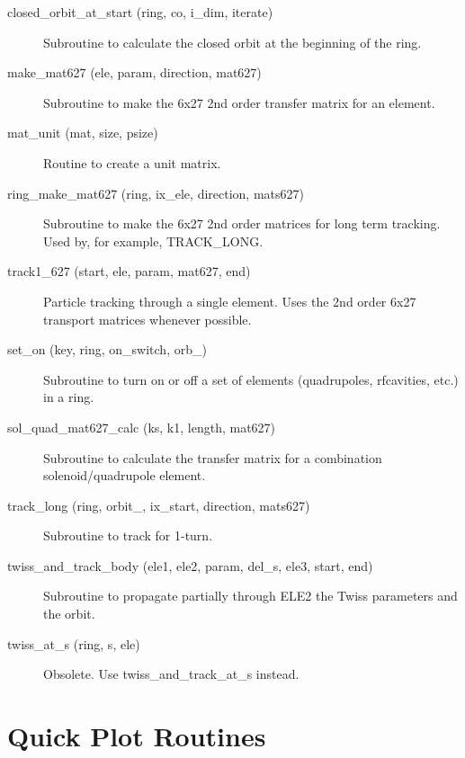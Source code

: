\begin{description}

\item[closed\_orbit\_at\_start (ring, co, i\_dim, iterate)] \Newline
Subroutine to calculate the closed orbit at the beginning of the ring. 

\item[make\_mat627 (ele, param, direction, mat627)] \Newline
Subroutine to make the 6x27 2nd order transfer matrix for an element. 

\item[mat\_unit (mat, size, psize)] \Newline 
Routine to create a unit matrix.

\item[ring\_make\_mat627 (ring, ix\_ele, direction, mats627)] \Newline
Subroutine to make the 6x27 2nd order matrices for long term tracking. 
Used by, for example, TRACK\_LONG. 

\item[track1\_627 (start, ele, param, mat627, end)] \Newline
Particle tracking through a single element. Uses the 2nd order 6x27 transport 
matrices whenever possible. 

\item[set\_on (key, ring, on\_switch, orb\_)] \Newline
Subroutine to turn on or off a set of elements (quadrupoles, rfcavities, etc.) in a ring. 

\item[sol\_quad\_mat627\_calc (ks, k1, length, mat627)] \Newline
Subroutine to calculate the transfer matrix for a combination solenoid/quadrupole element. 

\item[track\_long (ring, orbit\_, ix\_start, direction, mats627)] \Newline
Subroutine to track for 1-turn. 

\item[twiss\_and\_track\_body (ele1, ele2, param, del\_s, ele3, start, end)] \Newline
Subroutine to propagate partially through ELE2 the Twiss parameters and the orbit. 

\item[twiss\_at\_s (ring, s, ele)] \Newline
Obsolete. Use twiss\_and\_track\_at\_s instead. 

\end{description}

\section{Quick Plot Routines}
\label{r:qp}      


